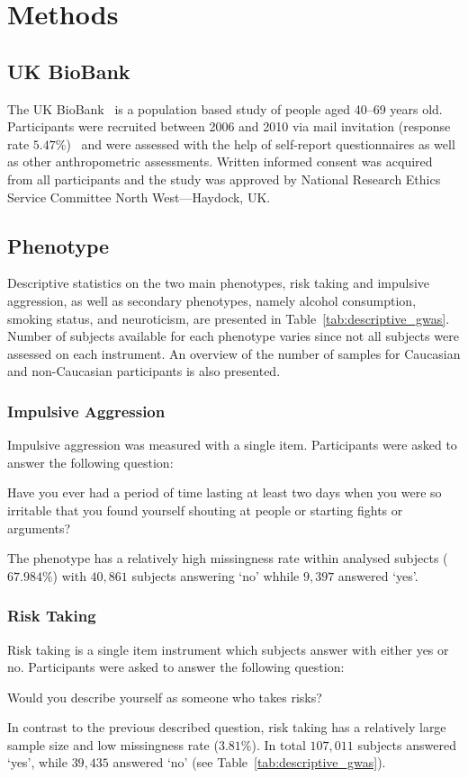 \section{Methods}
\label{sec:methods_assoc}

\subsection{UK BioBank}
\label{sub:uk_biobank}
The UK BioBank~\cite{Allen2014} is a population based study of people aged 40--69 years old. 
Participants were recruited between 2006 and 2010 via mail invitation (response rate $5.47\%$)~\cite{Sudlow2015} and were assessed with the help of self-report questionnaires as well as other anthropometric assessments.
Written informed consent was acquired from all participants and the study was approved by National Research Ethics Service Committee North West---Haydock, UK\@.

\subsection{Phenotype}
\label{sub:phenotype}

Descriptive statistics on the two main phenotypes, risk taking and impulsive aggression,
as well as secondary phenotypes, namely alcohol consumption, smoking status, and neuroticism, are presented in Table~\ref{tab:descriptive_gwas}.  
Number of subjects available for each phenotype varies since not all subjects were assessed on each instrument.
An overview of the number of samples for Caucasian and non-Caucasian participants is also presented.

\subsubsection{Impulsive Aggression}
\label{ssub:impulsive_aggression}
Impulsive aggression was measured with a single item.
Participants were asked to answer the following question:
\begin{displayquote}
  Have you ever had a period of time lasting at least two days when you were so irritable that you found yourself shouting at people or starting fights or arguments?
\end{displayquote}
The phenotype has a relatively high missingness rate within analysed subjects ($67.984\%$) with $40,861$ subjects answering `no' whhile $9,397$ answered `yes'.

\subsubsection{Risk Taking}
\label{ssub:risk_taking}
Risk taking is a single item instrument which subjects answer with either yes or no.
Participants were asked to answer the following question:
\begin{displayquote}
  Would you describe yourself as someone who takes risks?
\end{displayquote}
In contrast to the previous described question, risk taking has a relatively large sample size and low missingness rate ($3.81\%$).
In total $107,011$ subjects answered `yes', while $39,435$ answered `no' (see Table~\ref{tab:descriptive_gwas}).

